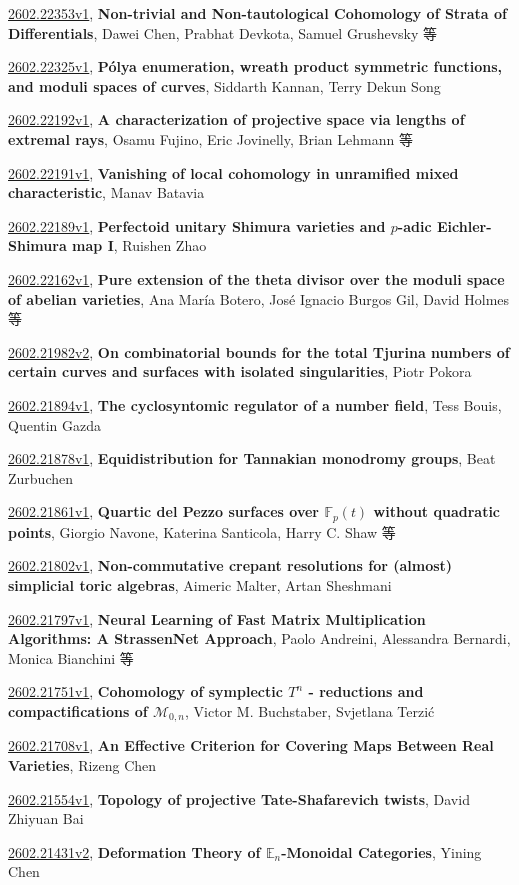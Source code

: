 \documentclass[9pt, a4paper]{article}
\theoremstyle{plain}
\theoremstyle{definition}
\theoremstyle{remark}
\newcommand{\arxiv}[3]{\href{https://arxiv.org/abs/#1}{#1}, \textbf{\textcolor{arxivblue}{#2}}, #3}
\begin{document}
\arxiv{2602.22353v1}{Non-trivial and Non-tautological Cohomology of Strata of Differentials}{Dawei Chen, Prabhat Devkota, Samuel Grushevsky 等}

\arxiv{2602.22325v1}{Pólya enumeration, wreath product symmetric functions, and moduli spaces of curves}{Siddarth Kannan, Terry Dekun Song}

\arxiv{2602.22192v1}{A characterization of projective space via lengths of extremal rays}{Osamu Fujino, Eric Jovinelly, Brian Lehmann 等}

\arxiv{2602.22191v1}{Vanishing of local cohomology in unramified mixed characteristic}{Manav Batavia}

\arxiv{2602.22189v1}{Perfectoid unitary Shimura varieties and $p$-adic Eichler-Shimura map I}{Ruishen Zhao}

\arxiv{2602.22162v1}{Pure extension of the theta divisor over the moduli space of abelian varieties}{Ana María Botero, José Ignacio Burgos Gil, David Holmes 等}

\arxiv{2602.21982v2}{On combinatorial bounds for the total Tjurina numbers of certain curves and surfaces with isolated singularities}{Piotr Pokora}

\arxiv{2602.21894v1}{The cyclosyntomic regulator of a number field}{Tess Bouis, Quentin Gazda}

\arxiv{2602.21878v1}{Equidistribution for Tannakian monodromy groups}{Beat Zurbuchen}

\arxiv{2602.21861v1}{Quartic del Pezzo surfaces over $\mathbb{F}_p(t)$ without quadratic points}{Giorgio Navone, Katerina Santicola, Harry C. Shaw 等}

\arxiv{2602.21802v1}{Non-commutative crepant resolutions for (almost) simplicial toric algebras}{Aimeric Malter, Artan Sheshmani}

\arxiv{2602.21797v1}{Neural Learning of Fast Matrix Multiplication Algorithms: A StrassenNet Approach}{Paolo Andreini, Alessandra Bernardi, Monica Bianchini 等}

\arxiv{2602.21751v1}{Cohomology of symplectic $T^n$ - reductions and compactifications of $\mathcal{M}_{0, n}$}{Victor M. Buchstaber, Svjetlana Terzić}

\arxiv{2602.21708v1}{An Effective Criterion for Covering Maps Between Real Varieties}{Rizeng Chen}

\arxiv{2602.21554v1}{Topology of projective Tate-Shafarevich twists}{David Zhiyuan Bai}

\arxiv{2602.21431v2}{Deformation Theory of $\mathbb{E}_n$-Monoidal Categories}{Yining Chen}
\end{document}
